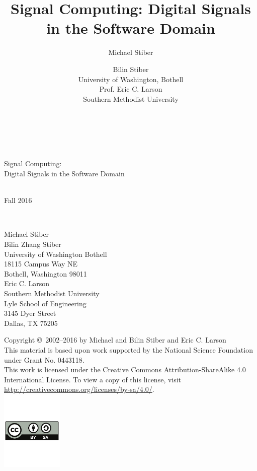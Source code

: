\documentclass[12pt]{book}
\title{Signal Computing: Digital Signals in the Software Domain}
\author{Michael Stiber \and Bilin Stiber\\ 
{\normalsize University of Washington, Bothell}\\
{\normalsize Prof. Eric C. Larson}\\
{\normalsize Southern Methodist University}}
\begin{document}
\begin{titlepage}

\mbox{}\\[0.5in]
\begin{center}
\mbox{}\hrulefill\mbox{}\\[0.25in]
{\Huge Signal Computing:}\\[0.25in]
{\LARGE Digital Signals in the Software Domain}\\[0.25in]
\mbox{}\hrulefill\mbox{}\\[3in]

\mbox{}\hfill
\parbox{1.5in}{\mbox{}}
\parbox{3in}{Fall 2016}\\[0.25in]
\mbox{}\hfill
\parbox{3in}{\raggedright
Michael Stiber\\
Bilin Zhang Stiber\\
University of Washington Bothell\\
18115 Campus Way NE\\
Bothell, Washington 98011\\[0.25in]
Eric C. Larson\\
Southern Methodist University\\
Lyle School of Engineering\\
3145 Dyer Street\\
Dallas, TX 75205}
\end{center}

\newpage
\mbox{}\vspace{2in}
\begin{flushright}
Copyright \copyright\ 2002--2016 by Michael and Bilin Stiber and Eric
C. Larson\\[1in]
This material is based upon work supported by the National Science
Foundation under Grant No. 0443118.\\[2in]
This work is licensed under the Creative Commons
Attribution-ShareAlike 4.0 International License. To view a copy of
this license, visit
\url{http://creativecommons.org/licenses/by-sa/4.0/}.\\
\includegraphics[height=1.5in]{by-sa}
\end{flushright}

\thispagestyle{empty}

\end{titlepage}
\end{document}
